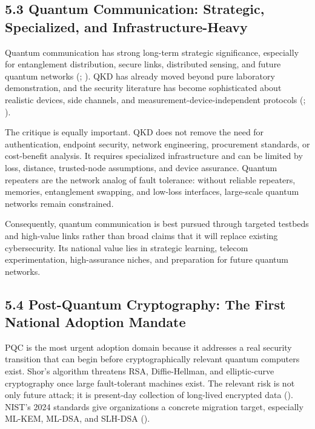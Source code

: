 \documentclass[
  11pt,
  letterpaper,
]{article}
\begin{document}
\subsection{5.3 Quantum Communication: Strategic, Specialized, and
Infrastructure-Heavy}\label{quantum-communication-strategic-specialized-and-infrastructure-heavy}

Quantum communication has strong long-term strategic significance,
especially for entanglement distribution, secure links, distributed
sensing, and future quantum networks (; ). QKD
has already moved beyond pure laboratory demonstration, and the security
literature has become sophisticated about realistic devices, side
channels, and measurement-device-independent protocols
(;
).

The critique is equally important. QKD does not remove the need for
authentication, endpoint security, network engineering, procurement
standards, or cost-benefit analysis. It requires specialized
infrastructure and can be limited by loss, distance, trusted-node
assumptions, and device assurance. Quantum repeaters are the network
analog of fault tolerance: without reliable repeaters, memories,
entanglement swapping, and low-loss interfaces, large-scale quantum
networks remain constrained.

Consequently, quantum communication is best pursued through targeted
testbeds and high-value links rather than broad claims that it will
replace existing cybersecurity. Its national value lies in strategic
learning, telecom experimentation, high-assurance niches, and
preparation for future quantum networks.

\subsection{5.4 Post-Quantum Cryptography: The First National Adoption
Mandate}\label{post-quantum-cryptography-the-first-national-adoption-mandate}

PQC is the most urgent adoption domain because it addresses a real
security transition that can begin before cryptographically relevant
quantum computers exist. Shor's algorithm threatens RSA, Diffie-Hellman,
and elliptic-curve cryptography once large fault-tolerant machines
exist. The relevant risk is not only future attack; it is present-day
collection of long-lived encrypted data (). NIST's 2024 standards give organizations a concrete migration
target, especially ML-KEM, ML-DSA, and SLH-DSA
().
\end{document}
